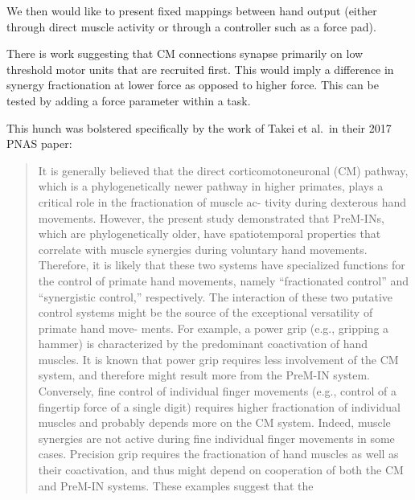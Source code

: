 {            We then would like to present fixed mappings between hand
            output (either through direct muscle activity or through a
            controller such as a force pad).

            There is work suggesting that CM connections synapse
            primarily on low threshold motor units that are recruited
            first. This would imply a difference in synergy
            fractionation at lower force as opposed to higher force.
            This can be tested by adding a force parameter within a
            task.

            This hunch was bolstered specifically by the work of Takei
            et al.~in their 2017 PNAS paper:

            \begin{quote}
            It is generally believed that the direct corticomotoneuronal
            (CM) pathway, which is a phylogenetically newer pathway in
            higher primates, plays a critical role in the fractionation
            of muscle ac- tivity during dexterous hand movements.
            However, the present study demonstrated that PreM-INs, which
            are phylogenetically older, have spatiotemporal properties
            that correlate with muscle synergies during voluntary hand
            movements. Therefore, it is likely that these two systems
            have specialized functions for the control of primate hand
            movements, namely ``fractionated control'' and ``synergistic
            control,'' respectively. The interaction of these two
            putative control systems might be the source of the
            exceptional versatility of primate hand move- ments. For
            example, a power grip (e.g., gripping a hammer) is
            characterized by the predominant coactivation of hand
            muscles. It is known that power grip requires less
            involvement of the CM system, and therefore might result
            more from the PreM-IN system. Conversely, fine control of
            individual finger movements (e.g., control of a fingertip
            force of a single digit) requires higher fractionation of
            individual muscles and probably depends more on the CM
            system. Indeed, muscle synergies are not active during fine
            individual finger movements in some cases. Precision grip
            requires the fractionation of hand muscles as well as their
            coactivation, and thus might depend on cooperation of both
            the CM and PreM-IN systems. These examples suggest that the

\end{quote}}
